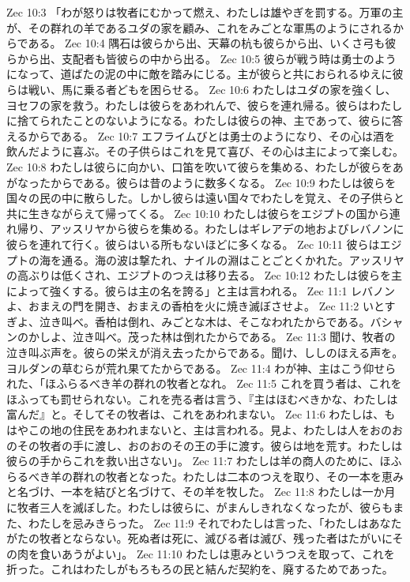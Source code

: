Zec 10:3  「わが怒りは牧者にむかって燃え、わたしは雄やぎを罰する。万軍の主が、その群れの羊であるユダの家を顧み、これをみごとな軍馬のようにされるからである。
Zec 10:4  隅石は彼らから出、天幕の杭も彼らから出、いくさ弓も彼らから出、支配者も皆彼らの中から出る。
Zec 10:5  彼らが戦う時は勇士のようになって、道ばたの泥の中に敵を踏みにじる。主が彼らと共におられるゆえに彼らは戦い、馬に乗る者どもを困らせる。
Zec 10:6  わたしはユダの家を強くし、ヨセフの家を救う。わたしは彼らをあわれんで、彼らを連れ帰る。彼らはわたしに捨てられたことのないようになる。わたしは彼らの神、主であって、彼らに答えるからである。
Zec 10:7  エフライムびとは勇士のようになり、その心は酒を飲んだように喜ぶ。その子供らはこれを見て喜び、その心は主によって楽しむ。
Zec 10:8  わたしは彼らに向かい、口笛を吹いて彼らを集める、わたしが彼らをあがなったからである。彼らは昔のように数多くなる。
Zec 10:9  わたしは彼らを国々の民の中に散らした。しかし彼らは遠い国々でわたしを覚え、その子供らと共に生きながらえて帰ってくる。
Zec 10:10  わたしは彼らをエジプトの国から連れ帰り、アッスリヤから彼らを集める。わたしはギレアデの地およびレバノンに彼らを連れて行く。彼らはいる所もないほどに多くなる。
Zec 10:11  彼らはエジプトの海を通る。海の波は撃たれ、ナイルの淵はことごとくかれた。アッスリヤの高ぶりは低くされ、エジプトのつえは移り去る。
Zec 10:12  わたしは彼らを主によって強くする。彼らは主の名を誇る」と主は言われる。
Zec 11:1  レバノンよ、おまえの門を開き、おまえの香柏を火に焼き滅ぼさせよ。
Zec 11:2  いとすぎよ、泣き叫べ。香柏は倒れ、みごとな木は、そこなわれたからである。バシャンのかしよ、泣き叫べ。茂った林は倒れたからである。
Zec 11:3  聞け、牧者の泣き叫ぶ声を。彼らの栄えが消え去ったからである。聞け、ししのほえる声を。ヨルダンの草むらが荒れ果てたからである。
Zec 11:4  わが神、主はこう仰せられた、「ほふらるべき羊の群れの牧者となれ。
Zec 11:5  これを買う者は、これをほふっても罰せられない。これを売る者は言う、『主はほむべきかな、わたしは富んだ』と。そしてその牧者は、これをあわれまない。
Zec 11:6  わたしは、もはやこの地の住民をあわれまないと、主は言われる。見よ、わたしは人をおのおのその牧者の手に渡し、おのおのその王の手に渡す。彼らは地を荒す。わたしは彼らの手からこれを救い出さない」。
Zec 11:7  わたしは羊の商人のために、ほふらるべき羊の群れの牧者となった。わたしは二本のつえを取り、その一本を恵みと名づけ、一本を結びと名づけて、その羊を牧した。
Zec 11:8  わたしは一か月に牧者三人を滅ぼした。わたしは彼らに、がまんしきれなくなったが、彼らもまた、わたしを忌みきらった。
Zec 11:9  それでわたしは言った、「わたしはあなたがたの牧者とならない。死ぬ者は死に、滅びる者は滅び、残った者はたがいにその肉を食いあうがよい」。
Zec 11:10  わたしは恵みというつえを取って、これを折った。これはわたしがもろもろの民と結んだ契約を、廃するためであった。
